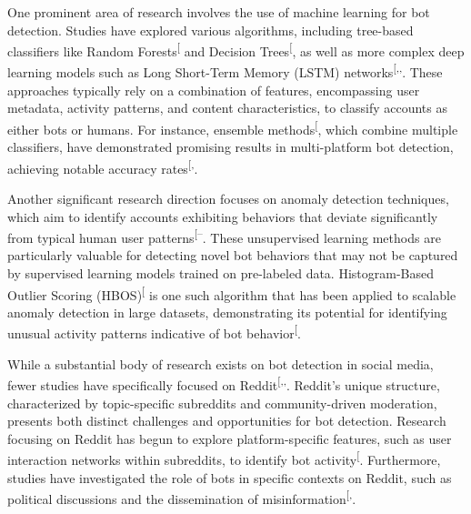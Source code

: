 \documentclass[
  12pt,
  letterpaper,
  DIV=11,
  numbers=noendperiod]{scrartcl}
\begin{document}
One prominent area of research involves the use of machine learning for
bot detection. Studies have explored various algorithms, including
tree-based classifiers like Random
Forests\textsuperscript{{[}\citeproc{ref-breiman2001random}{5}{]}} and
Decision
Trees\textsuperscript{{[}\citeproc{ref-breiman1984classification}{6}{]}},
as well as more complex deep learning models such as Long Short-Term
Memory (LSTM)
networks\textsuperscript{{[},,\citeproc{ref-hochreiter1997long}{8}{]}}.
These approaches typically rely on a combination of features,
encompassing user metadata, activity patterns, and content
characteristics, to classify accounts as either bots or humans. For
instance, ensemble
methods\textsuperscript{{[}\citeproc{ref-dietterich2000ensemble}{9}{]}},
which combine multiple classifiers, have demonstrated promising results
in multi-platform bot detection, achieving notable accuracy
rates\textsuperscript{{[},\citeproc{ref-multibotdetector}{4}{]}}.

Another significant research direction focuses on anomaly detection
techniques, which aim to identify accounts exhibiting behaviors that
deviate significantly from typical human user
patterns\textsuperscript{{[}--\citeproc{ref-chandola2009anomaly}{12}{]}}.
These unsupervised learning methods are particularly valuable for
detecting novel bot behaviors that may not be captured by supervised
learning models trained on pre-labeled data. Histogram-Based Outlier
Scoring
(HBOS)\textsuperscript{{[}\citeproc{ref-goldstein2012histogram}{13}{]}}
is one such algorithm that has been applied to scalable anomaly
detection in large datasets, demonstrating its potential for identifying
unusual activity patterns indicative of bot
behavior\textsuperscript{{[}\citeproc{ref-anomalycloudflare}{10}{]}}.

While a substantial body of research exists on bot detection in social
media, fewer studies have specifically focused on
Reddit\textsuperscript{{[},,\citeproc{ref-mlredditbots}{15}{]}}.
Reddit's unique structure, characterized by topic-specific subreddits
and community-driven moderation, presents both distinct challenges and
opportunities for bot detection. Research focusing on Reddit has begun
to explore platform-specific features, such as user interaction networks
within subreddits, to identify bot
activity\textsuperscript{{[}\citeproc{ref-redditbotnetwork}{14}{]}}.
Furthermore, studies have investigated the role of bots in specific
contexts on Reddit, such as political discussions and the dissemination
of
misinformation\textsuperscript{{[},\citeproc{ref-multibotdetector}{4}{]}}.
\end{document}
